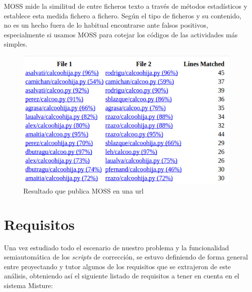 MOSS mide la similitud de entre ficheros texto a través de métodos estadísticos y establece esta medida fichero a fichero. Según el tipo de ficheros y su contenido, no es un hecho fuera de lo habitual encontrarse ante falsos positivos, especialmente si usamos MOSS para cotejar los códigos de las actividades más simples. \newpage %

\begin{figure}[H]
   \centering
   \includegraphics[width=14cm]{img/Selection_021_moss}
   \caption{Resultado que publica MOSS en una url}
   \label{figura:res_moss}
\end{figure}

\section{Requisitos}
\label{sec:requisitos}


Una vez estudiado todo el escenario de nuestro problema y la funcionalidad semiautomática de los \textit{scripts} de corrección, se estuvo definiendo de forma general entre proyectando y tutor algunos de los requisitos que se extrajeron de este análisis, obteniendo así el siguiente listado de requisitos a tener en cuenta en el sistema Misture:

